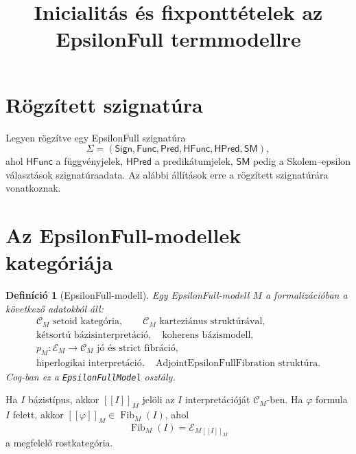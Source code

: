 \documentclass[11pt]{article}
\title{Inicialitás és fixponttételek az EpsilonFull termmodellre}
\author{}
\date{}
\newtheorem{definition}{Definíció}
\newcommand{\Fib}{\operatorname{Fib}}
\newcommand{\sem}[1]{[\![#1]\!]}
\begin{document}
\maketitle

\section{Rögzített szignatúra}

Legyen rögzítve egy EpsilonFull szignatúra
\[
  \Sigma=(\mathsf{Sign},\mathsf{Func},\mathsf{Pred},
          \mathsf{HFunc},\mathsf{HPred},\mathsf{SM}),
\]
ahol $\mathsf{HFunc}$ a függvényjelek, $\mathsf{HPred}$ a
predikátumjelek, $\mathsf{SM}$ pedig a Skolem--epsilon választások
szignatúraadata. Az alábbi állítások erre a rögzített szignatúrára
vonatkoznak.

\section{Az EpsilonFull-modellek kategóriája}

\begin{definition}[EpsilonFull-modell]
Egy EpsilonFull-modell $M$ a formalizációban a következő adatokból áll:
\[
\begin{gathered}
  \mathcal C_M \text{ setoid kategória}, \qquad
  \mathcal C_M \text{ karteziánus struktúrával},                                    \\
  \text{kétsortú bázisinterpretáció},\quad
  \text{koherens bázismodell},                                                       \\
  p_M:\mathcal E_M\to \mathcal C_M
  \text{ jó és strict fibráció},                                                     \\
  \text{hiperlogikai interpretáció},\quad
  \text{AdjointEpsilonFullFibration struktúra}.
\end{gathered}
\]
Coq-ban ez a \texttt{EpsilonFullModel} osztály.
\end{definition}

Ha $I$ bázistípus, akkor $\sem{I}_M$ jelöli az $I$ interpretációját
$\mathcal C_M$-ben. Ha $\varphi$ formula $I$ felett, akkor
$\sem{\varphi}_M\in \Fib_M(I)$, ahol
\[
  \Fib_M(I)=\mathcal E_M{}_{\sem{I}_M}
\]
a megfelelő rostkategória.
\end{document}
